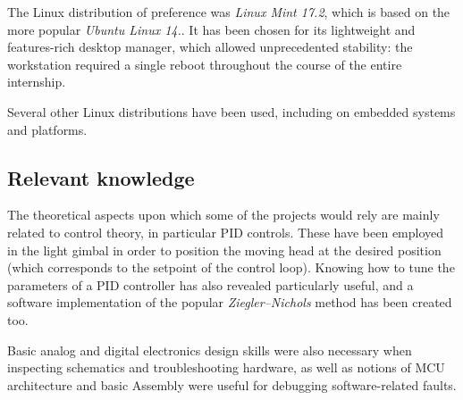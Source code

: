 The Linux distribution of preference was \emph{Linux Mint 17.2}, which is based on the more popular \emph{Ubuntu Linux 14.}.
It has been chosen for its lightweight and features-rich desktop manager, which allowed unprecedented stability: the workstation required a single reboot throughout the course of the entire internship.

Several other Linux distributions have been used, including on embedded systems and platforms.


\subsection{Relevant knowledge}
The theoretical aspects upon which some of the projects would rely are mainly related to control theory, in particular PID controls.
These have been employed in the light gimbal in order to position the moving head at the desired position (which corresponds to the setpoint of the control loop).
Knowing how to tune the parameters of a PID controller has also revealed particularly useful, and a software implementation of the popular \emph{Ziegler–Nichols} method has been created too.

Basic analog and digital electronics design skills were also necessary when inspecting schematics and troubleshooting hardware, as well as notions of MCU architecture and basic Assembly were useful for debugging software-related faults.